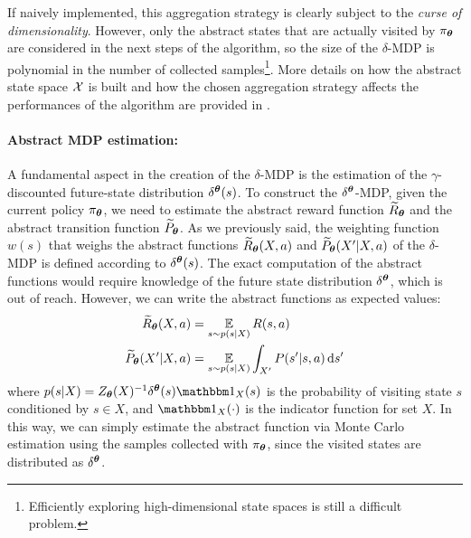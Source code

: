If naively implemented, this aggregation strategy is clearly subject to the \textit{curse of dimensionality}. However, only the abstract states that are actually visited by $\pi_{\boldsymbol{\theta}}$ are considered in the next steps of the algorithm, so the size of the $\delta$-\ac{MDP} is polynomial in the number of collected samples\footnote{Efficiently exploring high-dimensional state spaces is still a difficult problem.}.  
More details on how the abstract state space $\mathcal{X}$ is built and how the chosen aggregation strategy affects the performances of the algorithm are provided in .

\paragraph{Abstract MDP estimation:}\label{sec:mdpest}
A fundamental aspect in the creation of the $\delta$-\ac{MDP} is the estimation of the $\gamma$-discounted future-state distribution $\delta^{\boldsymbol{\theta}}(s)$.
To construct the $\delta^{\boldsymbol{\theta}}$-\ac{MDP}, given the current policy $\pi_{\boldsymbol{\theta}}$, we need to estimate the abstract reward function $\widetilde{R}_{\boldsymbol{\theta}}$ and the abstract transition function $\widetilde{P}_{\boldsymbol{\theta}}$. As we previously said, the weighting function $w(s)$ that weighs the abstract functions $\widetilde{R}_{\boldsymbol{\theta}}(X, a)$ and $\widetilde{P}_{\boldsymbol{\theta}}(X'|X, a)$ of the $\delta$-\ac{MDP} is defined according to $\delta^{\boldsymbol{\theta}}(s)$. The exact computation of the abstract functions would require knowledge of the future state distribution $\delta^{\boldsymbol{\theta}}$, which is out of reach. 
However, we can write the abstract functions as expected values:
\begin{align}
\widetilde{R}_{\boldsymbol{\theta}}(X, a) &= \operatorname*{\mathbb{E}}_{s \sim p(s | X)} R(s, a) \label{eq:mcr}\\
\widetilde{P}_{\boldsymbol{\theta}}(X' | X, a) &= \operatorname*{\mathbb{E}}_{s \sim p(s | X)} \int_{X'} P(s' | s, a) \,\mathrm{d} s'\label{eq:mcp}
\end{align}
where $p(s | X) = Z_{\vtheta}(X)^{-1}\delta^{\vtheta}(s)\Ind_X(s)$ is the probability of visiting state $s$ conditioned by $s\in X$, and $\Ind_X(\cdot)$ is the indicator function for set $X$.
In this way, we can simply estimate the abstract function via Monte Carlo estimation using the samples collected with $\pi_{\boldsymbol{\theta}}$, since the visited states are distributed as $\delta^{\boldsymbol{\theta}}$.
